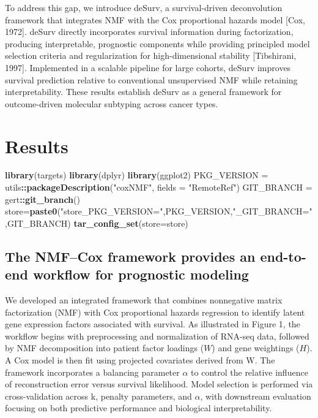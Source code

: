 \documentclass[
]{article}
\newenvironment{Shaded}{\begin{snugshade}}{\end{snugshade}}
\newcommand{\AttributeTok}[1]{\textcolor[rgb]{0.13,0.29,0.53}{#1}}
\newcommand{\FunctionTok}[1]{\textcolor[rgb]{0.13,0.29,0.53}{\textbf{#1}}}
\newcommand{\NormalTok}[1]{#1}
\newcommand{\OtherTok}[1]{\textcolor[rgb]{0.56,0.35,0.01}{#1}}
\newcommand{\SpecialCharTok}[1]{\textcolor[rgb]{0.81,0.36,0.00}{\textbf{#1}}}
\newcommand{\StringTok}[1]{\textcolor[rgb]{0.31,0.60,0.02}{#1}}
\begin{document}
To address this gap, we introduce deSurv, a survival-driven
deconvolution framework that integrates NMF with the Cox proportional
hazards model {[}Cox, 1972{]}. deSurv directly incorporates survival
information during factorization, producing interpretable, prognostic
components while providing principled model selection criteria and
regularization for high-dimensional stability {[}Tibshirani, 1997{]}.
Implemented in a scalable pipeline for large cohorts, deSurv improves
survival prediction relative to conventional unsupervised NMF while
retaining interpretability. These results establish deSurv as a general
framework for outcome-driven molecular subtyping across cancer types.

\section*{Results}\label{results}

\begin{Shaded}
\begin{Highlighting}[]
\FunctionTok{library}\NormalTok{(targets)}
\FunctionTok{library}\NormalTok{(dplyr)}
\FunctionTok{library}\NormalTok{(ggplot2)}
\NormalTok{PKG\_VERSION        }\OtherTok{=}\NormalTok{ utils}\SpecialCharTok{::}\FunctionTok{packageDescription}\NormalTok{(}\StringTok{"coxNMF"}\NormalTok{, }\AttributeTok{fields =} \StringTok{"RemoteRef"}\NormalTok{)}
\NormalTok{GIT\_BRANCH         }\OtherTok{=}\NormalTok{ gert}\SpecialCharTok{::}\FunctionTok{git\_branch}\NormalTok{()}
\NormalTok{store}\OtherTok{=}\FunctionTok{paste0}\NormalTok{(}\StringTok{"store\_PKG\_VERSION="}\NormalTok{,PKG\_VERSION,}\StringTok{"\_GIT\_BRANCH="}\NormalTok{,GIT\_BRANCH)}
\FunctionTok{tar\_config\_set}\NormalTok{(}\AttributeTok{store=}\NormalTok{store)}
\end{Highlighting}
\end{Shaded}

\subsection{The NMF--Cox framework provides an end-to-end workflow for
prognostic
modeling}\label{the-nmfcox-framework-provides-an-end-to-end-workflow-for-prognostic-modeling}

We developed an integrated framework that combines nonnegative matrix
factorization (NMF) with Cox proportional hazards regression to identify
latent gene expression factors associated with survival. As illustrated
in Figure 1, the workflow begins with preprocessing and normalization of
RNA-seq data, followed by NMF decomposition into patient factor loadings
(\(W\)) and gene weightings (\(H\)). A Cox model is then fit using
projected covariates derived from W. The framework incorporates a
balancing parameter \(\alpha\) to control the relative influence of
reconstruction error versus survival likelihood. Model selection is
performed via cross-validation across k, penalty parameters, and
\(\alpha\), with downstream evaluation focusing on both predictive
performance and biological interpretability.
\end{document}
